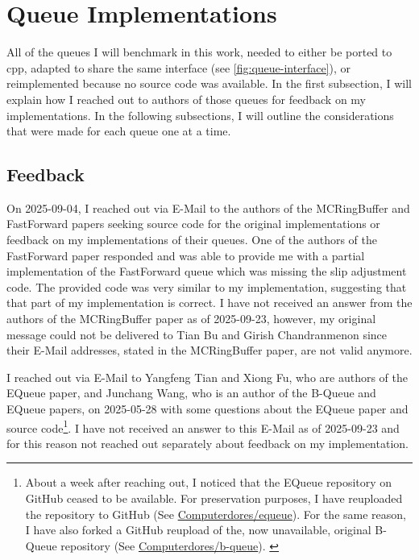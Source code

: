 \section{Queue Implementations}
All of the queues I will benchmark in this work, needed to either be ported to cpp, adapted to share the same
interface (see \autoref{fig:queue-interface}), or reimplemented because no source code was available.
In the first subsection, I will explain how I reached out to authors of those queues for feedback on my implementations.
In the following subsections, I will outline the considerations that were made for each queue one at a time.

\subsection{Feedback}
On 2025-09-04, I reached out via E-Mail to the authors of the MCRingBuffer and FastForward papers seeking
source code for the original implementations or feedback on my implementations of their queues.
One of the authors of the FastForward paper responded and was able to provide me with a partial
implementation of the FastForward queue which was missing the slip adjustment code.
The provided code was very similar to my implementation, suggesting that that part of my implementation is correct.
I have not received an answer from the authors of the MCRingBuffer paper as of 2025-09-23, however, my
original message could not be delivered to Tian Bu and Girish Chandranmenon since their E-Mail addresses,
stated in the MCRingBuffer paper, are not valid anymore.

I reached out via E-Mail to Yangfeng Tian and Xiong Fu, who are authors of the EQueue paper, and Junchang
Wang, who is an author of the B-Queue and EQueue papers, on 2025-05-28 with some questions about the EQueue
paper and source code\footnote{About a week after reaching out,
    I noticed that the EQueue repository on GitHub ceased to be available.
    For preservation purposes, I have reuploaded the repository to GitHub (See
    \href{https://github.com/Computerdores/equeue}{Computerdores/equeue}).
    For the same reason, I have also forked a GitHub reupload of the, now unavailable, original B-Queue
    repository (See \href{https://github.com/Computerdores/b-queue}{Computerdores/b-queue}).
\label{equeue-bqueue-links}}.
I have not received an answer to this E-Mail as of 2025-09-23 and for this reason not reached out separately
about feedback on my implementation.

